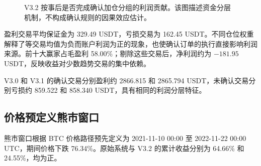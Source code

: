 \begin{figure}[H]
  \centering
  \caption{V3.2 按事后是否完成确认加仓分组的利润贡献。该图描述资金分层机制，不构成确认规则的因果效应估计。}
  \label{fig:confirmation-pnl}
\end{figure}

盈利交易平均保证金为 329.49 USDT，亏损交易为 162.45 USDT。不同仓位权重解释了等交易均值为负而账户利润为正的现象，也使确认订单的执行直接影响利润来源。前十大赢家占毛盈利 58.00\%；剔除这些交易后，净利润约为 $-181.95$ USDT，反映收益对少数趋势交易的集中依赖。

V3.0 和 V3.1 的确认交易分别盈利约 2866.815 和 2865.794 USDT，未确认交易分别亏损约 859.522 和 858.340 USDT，具有相同的利润分层特征。

\subsection{价格预定义熊市窗口}

熊市窗口根据 BTC 价格路径预先定义为 2021-11-10 00:00 至 2022-11-22 00:00 UTC，期间价格下跌 76.34\%。原始系统与 V3.2 的累计收益分别为 64.66\% 和 24.55\%，均为正。

